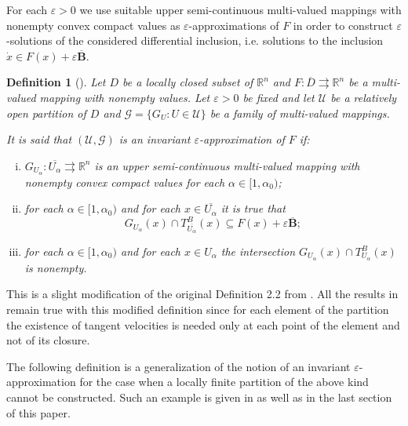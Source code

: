 \documentclass[a4paper]{article}
\newtheorem{definition}[thm]{Definition}
\begin{document}
For each $\varepsilon>0$  we use suitable upper semi-continuous multi-valued mappings with nonempty convex compact values as $\varepsilon$-approximations of $F$ in order to construct
$\varepsilon$-solutions of the considered differential inclusion, i.e. solutions to the inclusion $\dot x\in  F(x) + \varepsilon\overline{\mathbf{B}}$.

\begin{definition}[\cite{KR}]\label{invapr}
    Let $D$ be a locally closed subset of $\mathbb{R}^n$ and $F: \overline{D} \rightrightarrows \mathbb{R}^n$ be a multi-valued mapping with nonempty values. Let $\varepsilon>0$ be fixed and let $\mathcal{U}$ be a relatively open partition of $D$ and $\mathcal{G}=\{G_U : U \in \mathcal{U}\}$ be a family of multi-valued mappings.

    It is said that $(\mathcal{U},\mathcal{G})$ is an invariant $\varepsilon$-approximation of $F$ if:
    \begin{enumerate}[(i)]
        \item $G_{U_\alpha} : \overline{U_\alpha} \rightrightarrows \mathbb{R}^n$ is an upper semi-continuous multi-valued mapping with nonempty convex compact values for each $\alpha \in [1,\alpha_0)$;
        \item for each $\alpha \in [1,\alpha_0)$ and for each $x \in \overline{U_{\alpha}}$ it is true that $$G_{U_{\alpha}}(x) \cap T^B_{\overline{U_{\alpha}}}(x) \subseteq F(x) + \varepsilon\overline{\mathbf{B}};$$
        \item for each $\alpha \in [1,\alpha_0)$ and for each $x \in U_{\alpha}$ the intersection $G_{U_{\alpha}}(x) \cap T^B_{U_{\alpha}}(x)$ is nonempty.
    \end{enumerate}
\end{definition}

This is a slight modification of the original Definition 2.2 from \cite{KR}. All the results in \cite{KR} remain true with this modified definition since for each element of the partition the existence of tangent velocities is needed only at each point of the element and not of its closure.

The following definition is a generalization of the notion of an invariant $\varepsilon$-approximation for the case when a locally finite partition of the above kind cannot be constructed. Such an example is given in \cite{KR} as well as in the last section of this paper.
\end{document}
